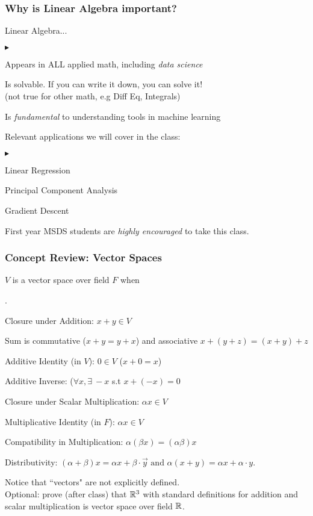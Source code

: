 \documentclass{beamer}
\renewenvironment{itemize}
\newcommand\fonteight{\fontsize{8}{9.6}\selectfont}
\renewenvironment{enumerate}%
{\begin{list}{\arabic{enumi}.}%
      {\setlength{\leftmargin}{2.5em}%
       \setlength{\itemsep}{-\parsep}%
       \setlength{\topsep}{-\parskip}%
       \usecounter{enumi}}%
 }{\end{list}}
\renewenvironment{itemize}%
{\begin{list}{$\blacktriangleright$}%
      {\setlength{\leftmargin}{2.5em}%
       \setlength{\itemsep}{-\parsep}%
       \setlength{\topsep}{-\parskip}%
       \usecounter{enumi}}%
 }{\end{list}}
\begin{document}
\begin{frame}
\frametitle{Why is Linear Algebra important?}
Linear Algebra...
\begin{itemize}
\item Appears in ALL applied math, including \textit{data science}
\item Is solvable. If you can write it down, you can solve it! \\
    \qquad (not true for other math, e.g Diff Eq, Integrals)
\item Is \textit{fundamental} to understanding tools in machine learning
\end{itemize}

Relevant applications we will cover in the class:
\begin{itemize}
\item Linear Regression
\item Principal Component Analysis
\item Gradient Descent
\end{itemize}

First year MSDS students are \textit{highly encouraged} to take this class.
\end{frame}
\begin{frame}
\frametitle{Concept Review: Vector Spaces}

\begin{definition}
	    $V$ is a vector space over field $F$ when
	    \fonteight
		\begin{enumerate}
		\item[1.] Closure under Addition: $x+y \in V$
		\item[2.] Sum is commutative ($x+y = y+x$) and associative $x+(y+z)= (x+y)+z$
		\item[3.] Additive Identity (in $V$): $0\in V$ ($x+0 =x$)
		\item[4.] Additive Inverse: ($\forall x, \exists\ -x $ s.t $ x+(-x)=0$
		\item[5.] Closure under Scalar Multiplication: $\alpha x \in V$
		\item[6.] Multiplicative Identity (in $F$): $\alpha x \in V$
		\item[7.] Compatibility in Multiplication: $\alpha (\beta x) = (\alpha \beta) x $
		\item[8.] Distributivity: $(\alpha + \beta) x = \alpha x + \beta \cdot \vec{y}
			 \text{ and }
			\alpha  (x + y) = \alpha  x + \alpha \cdot y.$
		\end{enumerate}
\end{definition}
Notice that ``vectors" are not explicitly defined. \\
Optional: prove (after class) that $\mathbb{R}^3$ with standard definitions for addition and scalar multiplication
 is vector space over field $\mathbb{R}$.
\end{frame}
\end{document}
